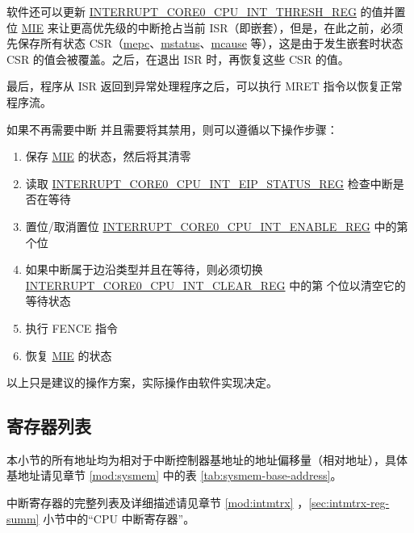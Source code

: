 \documentclass[main\_\_CN.tex]{subfiles}
\begin{document}
软件还可以更新 \hyperref[regdesc:INTERRUPTCORE0CPUINTTHRESHREG]{INTERRUPT\_CORE0\_CPU\_INT\_THRESH\_REG} 的值并置位 \hyperref[fielddesc:MSTATUSMIE]{MIE} 来让更高优先级的中断抢占当前 ISR（即嵌套），但是，在此之前，必须先保存所有状态 CSR（\hyperref[regdesc:MEPC]{mepc}、\hyperref[regdesc:MSTATUS]{mstatus}、\hyperref[regdesc:MCAUSE]{mcause} 等），这是由于发生嵌套时状态 CSR 的值会被覆盖。之后，在退出 ISR 时，再恢复这些 CSR 的值。

最后，程序从 ISR 返回到异常处理程序之后，可以执行 MRET 指令以恢复正常程序流。

如果不再需要中断  并且需要将其禁用，则可以遵循以下操作步骤：
\begin{enumerate}
    \item 保存 \hyperref[fielddesc:MSTATUSMIE]{MIE} 的状态，然后将其清零
    \item 读取 \hyperref[regdesc:INTERRUPTCORE0CPUINTEIPSTATUSREG]{INTERRUPT\_CORE0\_CPU\_INT\_EIP\_STATUS\_REG} 检查中断是否在等待
    \item 置位/取消置位 \hyperref[regdesc:INTERRUPTCORE0CPUINTENABLEREG]{INTERRUPT\_CORE0\_CPU\_INT\_ENABLE\_REG} 中的第  个位
    \item 如果中断属于边沿类型并且在等待，则必须切换 \hyperref[regdesc:INTERRUPTCORE0CPUINTCLEARREG]{INTERRUPT\_CORE0\_CPU\_INT\_CLEAR\_REG} 中的第  个位以清空它的等待状态
    \item 执行 FENCE 指令
    \item 恢复 \hyperref[fielddesc:MSTATUSMIE]{MIE} 的状态
\end{enumerate}

以上只是建议的操作方案，实际操作由软件实现决定。


\hypertarget{riscvcpu-int-reg-summ}{}
\subsection{寄存器列表}
\label{sec:riscvcpu-int-reg-summ}


本小节的所有地址均为相对于中断控制器基地址的地址偏移量（相对地址），具体基地址请见章节 \ref{mod:sysmem} \textit{} 中的表 \ref{tab:sysmem-base-address}。

中断寄存器的完整列表及详细描述请见章节 \ref{mod:intmtrx} \textit{}，\ref{sec:intmtrx-reg-summ} 小节中的“CPU 中断寄存器”。


\end{document}
